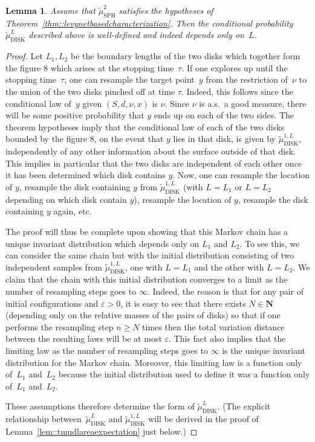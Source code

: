 \documentclass[JEP,XML,SOM,Unicode]{cedram}
\let\epsilon\varepsilon
\theoremstyle{plain}
\numberwithin{theorem}{section}
\newtheorem{lemma}[theorem]{Lemma}
\theoremstyle{definition}
\newcommand{\N}{\mathbf{N}}
\newcommand{\tmustwo}{\wt{\mu}_{\mathrm{SPH}}^2}
\newcommand{\tmudonel}{\wt{\mu}_{ \mathrm{DISK}}^{1, L}}
\newcommand{\tmudl}{\wt{\mu}_{\mathrm{DISK}}^L}
\let\wt\widetilde
\begin{document}
\begin{lemma}
\label{lem::tmudldefined}
Assume that $\tmustwo$ satisfies the hypotheses of Theorem~\ref{thm::levynetbasedcharacterization}. Then the conditional probability $\tmudl$ described above is well-defined and indeed depends only on~$L$.
\end{lemma}
\begin{proof}
Let $L_1,L_2$ be the boundary lengths of the two disks which together form the figure $8$ which arises at the stopping time~$\tau$. If one explores up until the stopping time~$\tau$, one can resample the target point~$y$ from the restriction of~$\nu$ to the union of the two disks pinched off at time $\tau$. Indeed, this follows since the conditional law of~$y$ given $(S,d,\nu,x)$ is $\nu$. Since $\nu$ is a.s.\ a good measure, there will be some positive probability that $y$ ends up on each of the two sides. The theorem hypotheses imply that the conditional law of each of the two disks bounded by the figure $8$, on the event that $y$ lies in that disk, is given by $\tmudonel$, independently of any other information about the surface outside of that disk. This implies in particular that the two disks are independent of each other once it has been determined which disk contains $y$. Now, one can resample the location of $y$, resample the disk containing $y$ from $\tmudonel$ (with $L=L_1$ or $L=L_2$ depending on which disk contain $y$), resample the location of $y$, resample the disk containing $y$ again, etc.

The proof will thus be complete upon showing that this Markov chain has a unique invariant distribution which depends only on $L_1$ and $L_2$. To see this, we can consider the same chain but with the initial distribution consisting of two independent samples from $\tmudonel$, one with $L=L_1$ and the other with $L=L_2$. We claim that the chain with this initial distribution converges to a limit as the number of resampling steps goes to $\infty$. Indeed, the reason is that for any pair of initial configurations and $\epsilon > 0$, it is easy to see that there exists $N \in \N$ (depending only on the relative masses of the pairs of disks) so that if one performs the resampling step $n \geq N$ times then the total variation distance between the resulting laws will be at most $\epsilon$. This fact also implies that the limiting law as the number of resampling steps goes to $\infty$ is the unique invariant distribution for the Markov chain. Moreover, this limiting law is a function only of~$L_1$ and~$L_2$ because the initial distribution used to define it was a function only of~$L_1$ and~$L_2$.

These assumptions therefore determine the form of $\tmudl$. (The explicit relationship between~$\tmudl$ and $\tmudonel$ will be derived in the proof of Lemma~\ref{lem::tmudlareaexpectation} just below.)
\end{proof}
\end{document}
